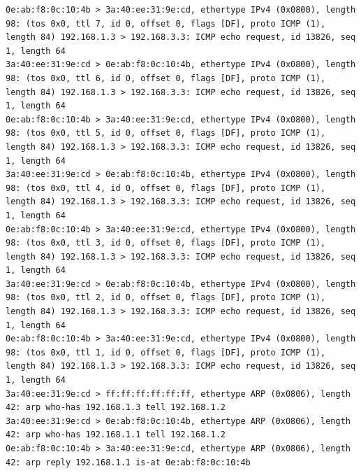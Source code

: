 \documentclass[a4paper,12pt]{article}
\begin{document}
\begin{Verbatim}
0e:ab:f8:0c:10:4b > 3a:40:ee:31:9e:cd, ethertype IPv4 (0x0800), length 98: (tos 0x0, ttl 7, id 0, offset 0, flags [DF], proto ICMP (1), length 84) 192.168.1.3 > 192.168.3.3: ICMP echo request, id 13826, seq 1, length 64
3a:40:ee:31:9e:cd > 0e:ab:f8:0c:10:4b, ethertype IPv4 (0x0800), length 98: (tos 0x0, ttl 6, id 0, offset 0, flags [DF], proto ICMP (1), length 84) 192.168.1.3 > 192.168.3.3: ICMP echo request, id 13826, seq 1, length 64
0e:ab:f8:0c:10:4b > 3a:40:ee:31:9e:cd, ethertype IPv4 (0x0800), length 98: (tos 0x0, ttl 5, id 0, offset 0, flags [DF], proto ICMP (1), length 84) 192.168.1.3 > 192.168.3.3: ICMP echo request, id 13826, seq 1, length 64
3a:40:ee:31:9e:cd > 0e:ab:f8:0c:10:4b, ethertype IPv4 (0x0800), length 98: (tos 0x0, ttl 4, id 0, offset 0, flags [DF], proto ICMP (1), length 84) 192.168.1.3 > 192.168.3.3: ICMP echo request, id 13826, seq 1, length 64
0e:ab:f8:0c:10:4b > 3a:40:ee:31:9e:cd, ethertype IPv4 (0x0800), length 98: (tos 0x0, ttl 3, id 0, offset 0, flags [DF], proto ICMP (1), length 84) 192.168.1.3 > 192.168.3.3: ICMP echo request, id 13826, seq 1, length 64
3a:40:ee:31:9e:cd > 0e:ab:f8:0c:10:4b, ethertype IPv4 (0x0800), length 98: (tos 0x0, ttl 2, id 0, offset 0, flags [DF], proto ICMP (1), length 84) 192.168.1.3 > 192.168.3.3: ICMP echo request, id 13826, seq 1, length 64
0e:ab:f8:0c:10:4b > 3a:40:ee:31:9e:cd, ethertype IPv4 (0x0800), length 98: (tos 0x0, ttl 1, id 0, offset 0, flags [DF], proto ICMP (1), length 84) 192.168.1.3 > 192.168.3.3: ICMP echo request, id 13826, seq 1, length 64
3a:40:ee:31:9e:cd > ff:ff:ff:ff:ff:ff, ethertype ARP (0x0806), length 42: arp who-has 192.168.1.3 tell 192.168.1.2
3a:40:ee:31:9e:cd > 0e:ab:f8:0c:10:4b, ethertype ARP (0x0806), length 42: arp who-has 192.168.1.1 tell 192.168.1.2
0e:ab:f8:0c:10:4b > 3a:40:ee:31:9e:cd, ethertype ARP (0x0806), length 42: arp reply 192.168.1.1 is-at 0e:ab:f8:0c:10:4b

\end{Verbatim}
\end{document}
